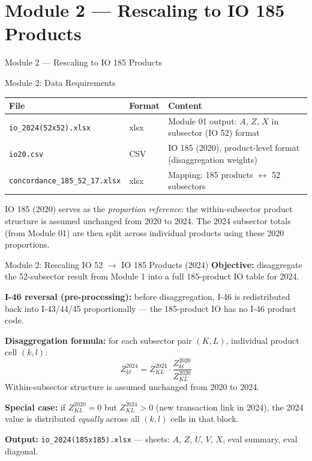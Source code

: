 \documentclass[aspectratio=169]{beamer}
\begin{document}
\section{Module 2 --- Rescaling to IO 185 Products}

\begin{frame}{Module 2 --- Rescaling to IO 185 Products}
\tableofcontents[currentsection]
\end{frame}

\begin{frame}{Module 2: Data Requirements}
\begin{center}
\renewcommand{\arraystretch}{1.3}
\scriptsize
\begin{tabular}{@{}p{5.0cm}p{1.0cm}p{6.6cm}@{}}
\toprule
\textbf{File} & \textbf{Format} & \textbf{Content} \\
\midrule
\texttt{io\_2024(52x52).xlsx} & xlsx & Module 01 output: $A$, $Z$, $X$ in subsector (IO 52) format \\
\texttt{io20.csv} & CSV & IO 185 (2020), product-level format (disaggregation weights) \\
\texttt{concordance\_185\_52\_17.xlsx} & xlsx & Mapping: 185 products $\leftrightarrow$ 52 subsectors \\
\bottomrule
\end{tabular}
\end{center}

\medskip
\small
IO 185 (2020) serves as the \textit{proportion reference}: the within-subsector product structure is assumed unchanged from 2020 to 2024. The 2024 subsector totals (from Module 01) are then split across individual products using these 2020 proportions.
\end{frame}

\begin{frame}{Module 2: Rescaling IO 52 $\to$ IO 185 Products (2024)}
\textbf{Objective:} disaggregate the 52-subsector result from Module 1 into a full 185-product IO table for 2024.

\medskip
\textbf{I-46 reversal (pre-processing):} before disaggregation, I-46 is redistributed back into I-43/44/45 proportionally --- the 185-product IO has no I-46 product code.

\medskip
\textbf{Disaggregation formula:} for each subsector pair $(K, L)$, individual product cell $(k, l)$:
\[
Z_{kl}^{2024} = Z_{KL}^{2024} \cdot \frac{Z_{kl}^{2020}}{Z_{KL}^{2020}}
\]
Within-subsector structure is assumed unchanged from 2020 to 2024.

\medskip
\textbf{Special case:} if $Z_{KL}^{2020} = 0$ but $Z_{KL}^{2024} > 0$ (new transaction link in 2024), the 2024 value is distributed \textit{equally} across all $(k,l)$ cells in that block.

\medskip
\textbf{Output:} \texttt{io\_2024(185x185).xlsx} --- sheets: $A$, $Z$, $U$, $V$, $X$, eval summary, eval diagonal.
\end{frame}
\end{document}
